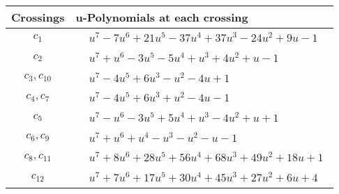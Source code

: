\documentclass[1p]{elsarticle_modified}
\theoremstyle{definition}
\begin{document}
\begin{tabular}{m{50pt}|m{274pt}}
Crossings & \hspace{64pt}u-Polynomials at each crossing \\
\hline $$\begin{aligned}c_{1}\end{aligned}$$&$\begin{aligned}
&u^7-7 u^6+21 u^5-37 u^4+37 u^3-24 u^2+9 u-1
\end{aligned}$\\
\hline $$\begin{aligned}c_{2}\end{aligned}$$&$\begin{aligned}
&u^7+u^6-3 u^5-5 u^4+u^3+4 u^2+u-1
\end{aligned}$\\
\hline $$\begin{aligned}c_{3},c_{10}\end{aligned}$$&$\begin{aligned}
&u^7-4 u^5+6 u^3- u^2-4 u+1
\end{aligned}$\\
\hline $$\begin{aligned}c_{4},c_{7}\end{aligned}$$&$\begin{aligned}
&u^7-4 u^5+6 u^3+u^2-4 u-1
\end{aligned}$\\
\hline $$\begin{aligned}c_{5}\end{aligned}$$&$\begin{aligned}
&u^7- u^6-3 u^5+5 u^4+u^3-4 u^2+u+1
\end{aligned}$\\
\hline $$\begin{aligned}c_{6},c_{9}\end{aligned}$$&$\begin{aligned}
&u^7+u^6+u^4- u^3- u^2- u-1
\end{aligned}$\\
\hline $$\begin{aligned}c_{8},c_{11}\end{aligned}$$&$\begin{aligned}
&u^7+8 u^6+28 u^5+56 u^4+68 u^3+49 u^2+18 u+1
\end{aligned}$\\
\hline $$\begin{aligned}c_{12}\end{aligned}$$&$\begin{aligned}
&u^7+7 u^6+17 u^5+30 u^4+45 u^3+27 u^2+6 u+4
\end{aligned}$\\
\hline
\end{tabular}\\~\\
\end{document}
